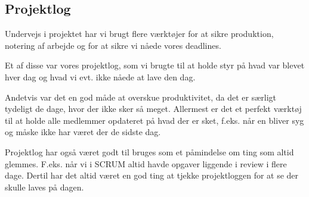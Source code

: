 \subsection{Projektlog}

Undervejs i projektet har vi brugt flere værktøjer for at sikre produktion, notering af arbejde og for at sikre vi nåede vores deadlines.

Et af disse var vores projektlog, som vi brugte til at holde styr på hvad var blevet hver dag og hvad vi evt. ikke nåede at lave den dag.

Andetvis var det en god måde at overskue produktivitet, da det er særligt tydeligt de dage, hvor der ikke sker så meget. Allermest er det et perfekt værktøj til at holde alle medlemmer opdateret på hvad der er sket, f.eks. når en bliver syg og måske ikke har været der de sidste dag.

Projektlog har også været godt til bruges som et påmindelse om ting som altid glemmes. F.eks. når vi i SCRUM altid havde opgaver liggende i review i flere dage. Dertil har det altid været en god ting at tjekke projektloggen for at se der skulle laves på dagen.